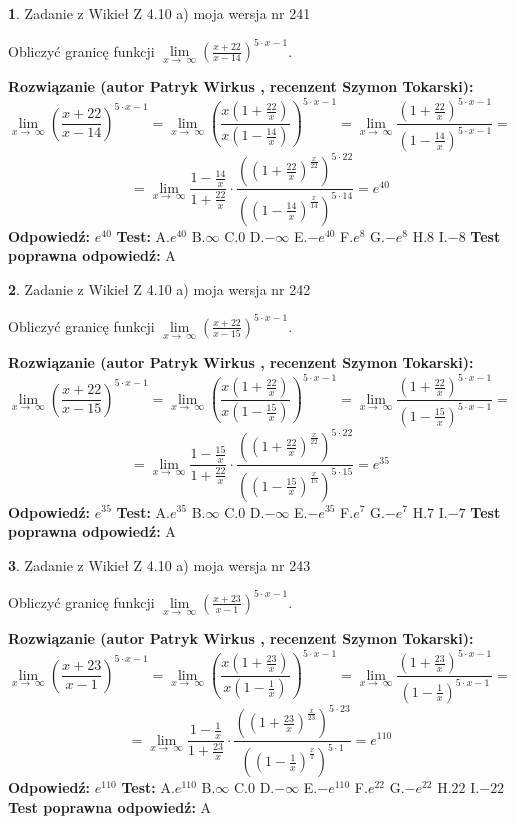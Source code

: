 \documentclass[12pt, a4paper]{article}
\theoremstyle{definition} %
\newtheorem{zad}{}
\newcommand{\zadStart}[1]{\begin{zad}#1\newline}
\newcommand{\zadStop}{\end{zad}}
\newcommand{\rozwStart}[2]{\noindent \textbf{Rozwiązanie (autor #1 , recenzent #2): }\newline}
\newcommand{\rozwStop}{\newline}
\newcommand{\odpStart}{\noindent \textbf{Odpowiedź:}\newline}
\newcommand{\odpStop}{\newline}
\newcommand{\testStart}{\noindent \textbf{Test:}\newline}
\newcommand{\testStop}{\newline}
\newcommand{\kluczStart}{\noindent \textbf{Test poprawna odpowiedź:}\newline}
\newcommand{\kluczStop}{\newline}
\begin{document}
\zadStart{Zadanie z Wikieł Z 4.10 a) moja wersja nr 241}

Obliczyć granicę funkcji  $\lim\limits_{x\to\ \infty}(\frac{x+22}{x-14})^{5\cdot x-1}$.
\zadStop
\rozwStart{Patryk Wirkus}{Szymon Tokarski}
$$\lim\limits_{x\to\ \infty}(\frac{x+22}{x-14})^{5\cdot x-1} = \lim\limits_{x\to\ \infty}(\frac{x(1+\frac{22}{x})}{x(1-\frac{14}{x})})^{5\cdot x-1}=\lim\limits_{x\to\ \infty}\frac{(1+\frac{22}{x})^{5\cdot x-1}}{(1-\frac{14}{x})^{5\cdot x-1}}=$$
$$=\lim\limits_{x\to\ \infty}\frac{1-\frac{14}{x}}{1+\frac{22}{x}}\cdot\frac{((1+\frac{22}{x})^{\frac{x}{22}})^{5\cdot22}}{((1-\frac{14}{x})^{\frac{x}{14}})^{5\cdot14}}=e^{40}$$
\rozwStop
\odpStart
$e^{40}$
\odpStop
\testStart
A.$e^{40}$ B.$\infty$ C.$0$ D.$-\infty$ E.$-e^{40}$
F.$e^{8}$ G.$-e^{8}$
H.$8$
I.$-8$
\testStop
\kluczStart
A
\kluczStop



\zadStart{Zadanie z Wikieł Z 4.10 a) moja wersja nr 242}

Obliczyć granicę funkcji  $\lim\limits_{x\to\ \infty}(\frac{x+22}{x-15})^{5\cdot x-1}$.
\zadStop
\rozwStart{Patryk Wirkus}{Szymon Tokarski}
$$\lim\limits_{x\to\ \infty}(\frac{x+22}{x-15})^{5\cdot x-1} = \lim\limits_{x\to\ \infty}(\frac{x(1+\frac{22}{x})}{x(1-\frac{15}{x})})^{5\cdot x-1}=\lim\limits_{x\to\ \infty}\frac{(1+\frac{22}{x})^{5\cdot x-1}}{(1-\frac{15}{x})^{5\cdot x-1}}=$$
$$=\lim\limits_{x\to\ \infty}\frac{1-\frac{15}{x}}{1+\frac{22}{x}}\cdot\frac{((1+\frac{22}{x})^{\frac{x}{22}})^{5\cdot22}}{((1-\frac{15}{x})^{\frac{x}{15}})^{5\cdot15}}=e^{35}$$
\rozwStop
\odpStart
$e^{35}$
\odpStop
\testStart
A.$e^{35}$ B.$\infty$ C.$0$ D.$-\infty$ E.$-e^{35}$
F.$e^{7}$ G.$-e^{7}$
H.$7$
I.$-7$
\testStop
\kluczStart
A
\kluczStop



\zadStart{Zadanie z Wikieł Z 4.10 a) moja wersja nr 243}

Obliczyć granicę funkcji  $\lim\limits_{x\to\ \infty}(\frac{x+23}{x-1})^{5\cdot x-1}$.
\zadStop
\rozwStart{Patryk Wirkus}{Szymon Tokarski}
$$\lim\limits_{x\to\ \infty}(\frac{x+23}{x-1})^{5\cdot x-1} = \lim\limits_{x\to\ \infty}(\frac{x(1+\frac{23}{x})}{x(1-\frac{1}{x})})^{5\cdot x-1}=\lim\limits_{x\to\ \infty}\frac{(1+\frac{23}{x})^{5\cdot x-1}}{(1-\frac{1}{x})^{5\cdot x-1}}=$$
$$=\lim\limits_{x\to\ \infty}\frac{1-\frac{1}{x}}{1+\frac{23}{x}}\cdot\frac{((1+\frac{23}{x})^{\frac{x}{23}})^{5\cdot23}}{((1-\frac{1}{x})^{\frac{x}{1}})^{5\cdot1}}=e^{110}$$
\rozwStop
\odpStart
$e^{110}$
\odpStop
\testStart
A.$e^{110}$ B.$\infty$ C.$0$ D.$-\infty$ E.$-e^{110}$
F.$e^{22}$ G.$-e^{22}$
H.$22$
I.$-22$
\testStop
\kluczStart
A
\kluczStop
\end{document}

